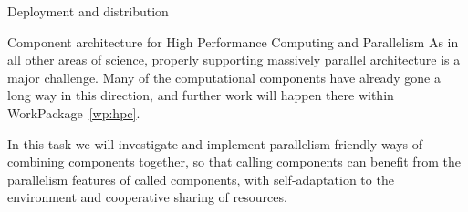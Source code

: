\begin{Workpackage}{\thewpno}
  \begin{task}{Deployment and distribution}
  \end{task}

  \begin{task}{Component architecture for High Performance Computing and Parallelism}
    As in all other areas of science, properly supporting massively
    parallel architecture is a major challenge. Many of the
    computational components have already gone a long way in this
    direction, and further work will happen there within
    WorkPackage~\ref{wp:hpc}.

    In this task we will investigate and implement
    parallelism-friendly ways of combining components together, so
    that calling components can benefit from the parallelism features
    of called components, with self-adaptation to the environment and
    cooperative sharing of resources.
  \end{task}

  \begin{WPDeliverables}



\end{WPDeliverables}
\end{Workpackage}
